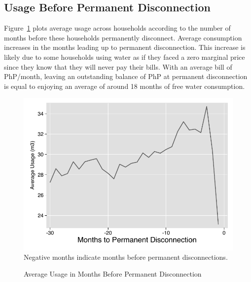 \documentclass[12pt]{article}
\begin{document}
\subsection{Usage Before Permanent Disconnection}\label{appendix:permanentdc}


Figure~\ref{figure:dc_permanent} plots average usage across households according to the number of months before these households permanently disconnect. Average consumption increases in the months leading up to permanent disconnection.  This increase is likely due to some households using water as if they faced a zero marginal price since they know that they will never pay their bills.  With an average bill of PhP/month, leaving an outstanding balance of PhP at permanent disconnection is equal to enjoying an average of around 18 months of free water consumption.

\begin{figure}[H]
\centering
\caption{Average Usage in Months Before Permanent Disconnection}\label{figure:dc_permanent}
\includegraphics[scale=.7]{tables/line_disc_graph.pdf} \\
{ \footnotesize Negative months indicate months before permanent disconnections. }
\end{figure}





\end{document}
